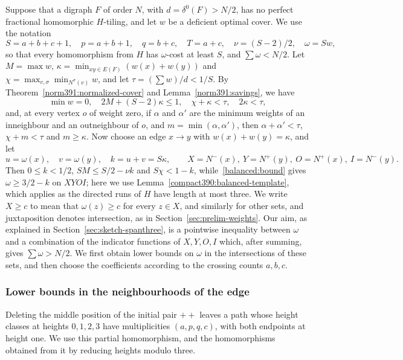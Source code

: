 Suppose that a digraph $F$ of order $N$, with $d=\delta^0(F)>N/2$, has no perfect fractional homomorphic $H$-tiling, and let $w$ be a deficient optimal cover. We use the notation
\[
 S=a+b+c+1,\quad p=a+b+1,\quad q=b+c,\quad T=a+c,
 \quad\nu=(S-2)/2,\quad\omega=Sw,
\]
so that every homomorphism from $H$ has $\omega$-cost at least $S$, and $\sum\omega<N/2$.
Let $M=\max w$, $\kappa=\min_{xy\in E(F)}(w(x)+w(y))$
and $\chi=\max_{v,\sigma}\min_{N^\sigma(v)}w$, and let $\tau=(\sum w)/d<1/S$. By Theorem~\ref{norm391:normalized-cover} and
Lemma~\ref{norm391:savings}, we have
\[
 \min w=0,\quad
 2M+(S-2)\kappa\le1,
 \quad\chi+\kappa<\tau,\quad2\kappa<\tau,
\]
and, at every vertex $o$ of weight zero, if $\alpha$ and $\alpha'$ are the minimum weights of an inneighbour and an outneighbour of $o$, and $m=\min(\alpha,\alpha')$, then $\alpha+\alpha'<\tau$, $\chi+m<\tau$ and $m\ge\kappa$.
Now choose an edge $x\to y$ with $w(x)+w(y)=\kappa$, and let
\[
 u=\omega(x),\quad v=\omega(y),\quad k=u+v=S\kappa,\qquad
 X=N^-(x),\ Y=N^+(y),\ O=N^+(x),\ I=N^-(y).
\]
Then $0\le k<1/2$, $SM\le S/2-\nu k$ and $S\chi<1-k$, while~\eqref{balanced:bound} gives
$\omega\ge3/2-k$ on $XYOI$; here we use Lemma~\ref{compact390:balanced-template}, which applies as the directed runs of $H$ have length at most three.
We write $X\ge c$ to mean that $\omega(z)\ge c$ for every $z\in X$, and similarly for other sets, and juxtaposition denotes intersection, as in Section~\ref{sec:prelim-weights}.
Our aim, as explained in Section~\ref{sec:sketch-spanthree}, is a pointwise inequality between $\omega$ and a combination of the indicator functions of $X,Y,O,I$ which, after summing, gives $\sum\omega>N/2$. We first obtain lower bounds on $\omega$ in the intersections of these sets, and then choose the coefficients according to the crossing counts $a,b,c$.

\subsubsection{Lower bounds in the neighbourhoods of the edge}
Deleting the middle position of the initial pair $++$ leaves a path whose height classes at heights $0,1,2,3$ have multiplicities $(a,p,q,c)$, with both endpoints at height one. We use this partial homomorphism, and the homomorphisms obtained from it by reducing heights modulo three.

